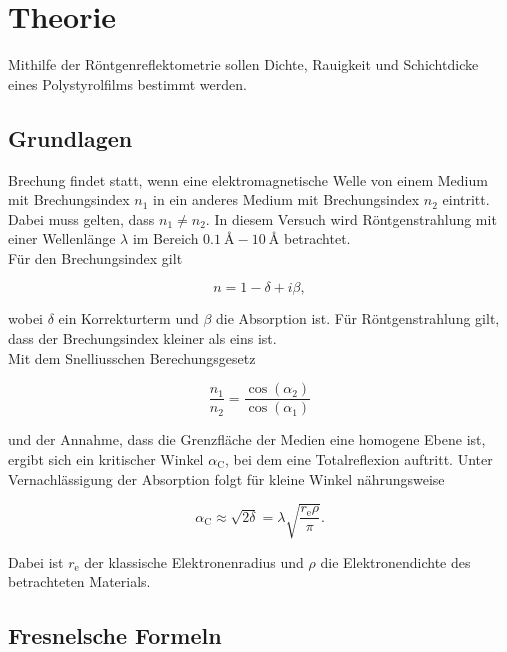 \section{Theorie}
\label{sec:Theorie}

Mithilfe der Röntgenreflektometrie sollen Dichte, Rauigkeit und Schichtdicke eines Polystyrolfilms bestimmt werden.

\subsection{Grundlagen}

Brechung findet statt, wenn eine elektromagnetische Welle von einem Medium mit Brechungsindex $n_1$ in ein anderes Medium mit 
Brechungsindex $n_2$ eintritt. Dabei muss gelten, dass $n_1 \neq n_2$. In diesem Versuch wird Röntgenstrahlung mit einer 
Wellenlänge $\lambda$ im Bereich $\SI{0.1}{\angstrom}-\SI{10}{\angstrom}$ betrachtet. \\
Für den Brechungsindex gilt 

\begin{equation*}
    n = 1-\delta +i\beta,
\end{equation*}

wobei $\delta$ ein Korrekturterm und $\beta$ die Absorption ist. Für Röntgenstrahlung gilt, dass der Brechungsindex kleiner als 
eins ist. \\
Mit dem Snelliusschen Berechungsgesetz

\begin{equation*}
    \frac{n_1}{n_2} = \frac{\cos{\left(\alpha_2\right)}}{\cos{\left(\alpha_1\right)}}
\end{equation*}

und der Annahme, dass die Grenzfläche der Medien eine homogene Ebene ist, ergibt sich ein kritischer Winkel $\alpha_\text{C}$, 
bei dem eine Totalreflexion auftritt. Unter Vernachlässigung der Absorption folgt für kleine Winkel nährungsweise

\begin{equation*}
    \alpha_\text{C} \approx \sqrt{2\delta} = \lambda \sqrt{\frac{r_\text{e}\rho}{\pi}}.
\end{equation*}

Dabei ist $r_\text{e}$ der klassische Elektronenradius und $\rho$ die Elektronendichte des betrachteten Materials. 

\subsection{Fresnelsche Formeln}

